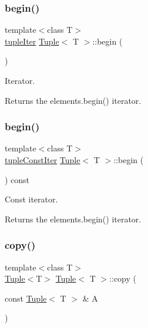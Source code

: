 \subsubsection{\texorpdfstring{begin()}{begin()}\hspace{0.1cm}{\footnotesize\ttfamily [1/2]}}
{\footnotesize\ttfamily template$<$class T$>$ \\
\mbox{\hyperlink{maths_8hh_ad22dcdeefda7d41523cc1604953eb6cc}{tuple\+Iter}} \mbox{\hyperlink{class_tuple}{Tuple}}$<$ T $>$\+::begin (\begin{DoxyParamCaption}{ }\end{DoxyParamCaption})\hspace{0.3cm}{\ttfamily [inline]}}



Iterator. 

\begin{DoxyReturn}{Returns}
the elements.\+begin() iterator. 
\end{DoxyReturn}
\mbox{\label{class_tuple_ab5d618dac69995db6adb0e657cd73bb3}} 
\subsubsection{\texorpdfstring{begin()}{begin()}\hspace{0.1cm}{\footnotesize\ttfamily [2/2]}}
{\footnotesize\ttfamily template$<$class T$>$ \\
\mbox{\hyperlink{maths_8hh_a2eba794860251c1b30e532df32ee4d1b}{tuple\+Const\+Iter}} \mbox{\hyperlink{class_tuple}{Tuple}}$<$ T $>$\+::begin (\begin{DoxyParamCaption}{ }\end{DoxyParamCaption}) const\hspace{0.3cm}{\ttfamily [inline]}}



Const iterator. 

\begin{DoxyReturn}{Returns}
the elements.\+begin() iterator. 
\end{DoxyReturn}
\mbox{\label{class_tuple_ac4b525e02b40a646ebd4f600fe78d00f}} 
\subsubsection{\texorpdfstring{copy()}{copy()}}
{\footnotesize\ttfamily template$<$class T$>$ \\
\mbox{\hyperlink{class_tuple}{Tuple}}$<$T$>$ \mbox{\hyperlink{class_tuple}{Tuple}}$<$ T $>$\+::copy (\begin{DoxyParamCaption}\item[{const \mbox{\hyperlink{class_tuple}{Tuple}}$<$ T $>$ \&}]{A }\end{DoxyParamCaption})\hspace{0.3cm}{\ttfamily [inline]}}



